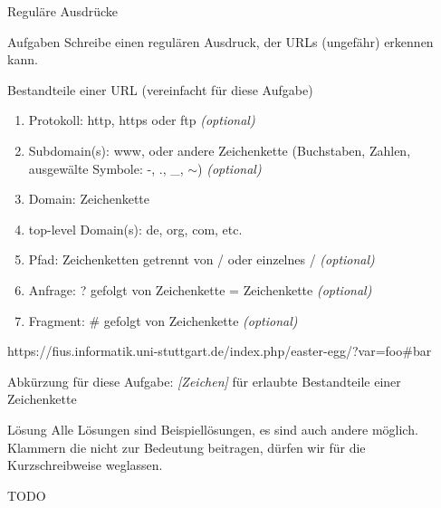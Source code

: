 {
	\begin{frame}{Reguläre Ausdrücke}
		\begin{alertblock}{Aufgaben}
			Schreibe einen regulären Ausdruck, der URLs (ungefähr) erkennen kann.
		\end{alertblock}
		\begin{block}{Bestandteile einer URL (vereinfacht für diese Aufgabe)}
			\begin{enumerate}
				\item \alert<2>{Protokoll}: http, https oder ftp \emph{(optional)}
				\item \alert<3>{Subdomain(s)}: www, oder andere Zeichenkette (Buchstaben, Zahlen, ausgewälte Symbole: -, ., \_, $\sim$) \emph{(optional)}
				\item \alert<4>{Domain}: Zeichenkette
				\item \alert<5>{top-level Domain(s)}: de, org, com, etc.
				\item \alert<6>{Pfad}: Zeichenketten getrennt von / oder einzelnes / \emph{(optional)}
				\item \alert<7>{Anfrage}: ? gefolgt von Zeichenkette = Zeichenkette \emph{(optional)}
				\item \alert<8>{Fragment}: \# gefolgt von Zeichenkette \emph{(optional)}
			\end{enumerate}
			\small{\alert<2>{https}://\alert<3>{fius}.\alert<3>{informatik}.\alert<4>{uni-stuttgart}.\alert<5>{de}\alert<6>{/index.php/easter-egg/}\alert<7>{?var=foo}\alert<8>{\#bar}}
		\end{block}
		\footnotesize{Abkürzung für diese Aufgabe: \emph{[Zeichen]} für erlaubte Bestandteile einer Zeichenkette}
	\end{frame}
}

{
	\begin{frame}{Lösung}
		Alle Lösungen sind Beispiellösungen, es sind auch andere möglich.\\
		Klammern die nicht zur Bedeutung beitragen, dürfen wir für die Kurzschreibweise weglassen.
		
		TODO
		
	\end{frame}
}

%
%

